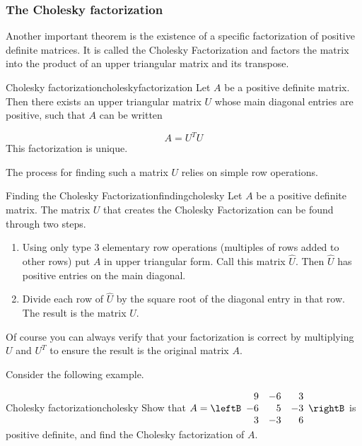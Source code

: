 \subsubsection{The Cholesky factorization}

Another important theorem is the existence of a specific factorization of positive definite matrices. It is called the Cholesky Factorization and factors the matrix into the product of an upper triangular matrix and its transpose.

\begin{theorem}{Cholesky factorization}{choleskyfactorization}
Let $A$ be a positive definite matrix. Then
there exists an upper triangular matrix $U$ whose main diagonal entries are positive, such that $A$ can be written

\begin{equation*}
A=
U^TU
\end{equation*}
This factorization is unique.
\end{theorem}

The process for finding such a matrix $U$ relies on simple row operations.

\begin{procedure}{Finding the Cholesky Factorization}{findingcholesky}
Let $A$ be a positive definite matrix. The matrix $U$ that creates the Cholesky Factorization can be found through two steps.
\begin{enumerate}
\item Using only type $3$ elementary row operations (multiples of rows added to other rows) put $A$ in upper triangular form. Call this matrix $\hat{U}$. Then $\hat{U}$ has positive entries on the main diagonal. 
\item Divide each row of $\hat{U}$ by the square root of the diagonal entry in that row. The result is the matrix $U$. 
\end{enumerate}
\end{procedure}

Of course you can always verify that your factorization is correct by multiplying $U$ and $U^T$ to ensure the result is the original matrix $A$. 

Consider the following example.

\begin{example}{Cholesky factorization}{cholesky}
Show that
$A=\leftB\begin{array}{rrr}
9 & -6 & 3 \\ -6 & 5 & -3 \\ 3 & -3 & 6 
\end{array}\rightB$ 
is positive definite, and find the Cholesky factorization of $A$.
\end{example}

